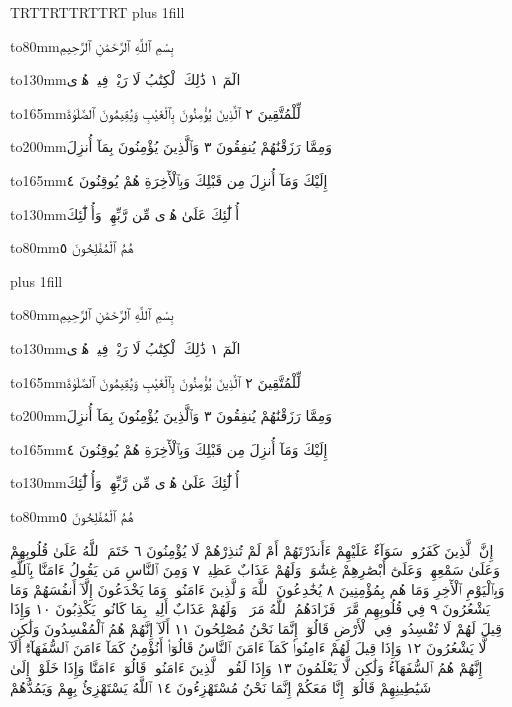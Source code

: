\documentclass{article}
\begin{document}
\medinafontvar\pagedir TRT\pardir TRT\bodydir TRT\textdir TRT
\topglue 0pt plus 1fill
\leavevmode
\centerline{\hbox to80mm{بِسْمِ ٱللَّهِ ٱلرَّحْمَٰنِ ٱلرَّحِيمِ}}
\centerline{\hbox to130mm{الٓمٓ ١ ذَٰلِكَ ٱلْكِتَٰبُ لَا رَيْبَۛ فِيهِۛ هُدࣰى}}
\centerline{\hbox to165mm{لِّلْمُتَّقِينَ ٢ ٱلَّذِينَ يُؤْمِنُونَ بِٱلْغَيْبِ وَيُقِيمُونَ ٱلصَّلَوٰةَ}}
\centerline{\hbox to200mm{وَمِمَّا رَزَقْنَٰهُمْ يُنفِقُونَ ٣ وَٱلَّذِينَ يُؤْمِنُونَ بِمَآ أُنزِلَ}}
\centerline{\hbox to165mm{إِلَيْكَ وَمَآ أُنزِلَ مِن قَبْلِكَ وَبِٱلْأٓخِرَةِ هُمْ يُوقِنُونَ ٤}}
\centerline{\hbox to130mm{أُو۟لَٰٓئِكَ عَلَىٰ هُدࣰى مِّن رَّبِّهِمْۖ وَأُو۟لَٰٓئِكَ}}
\centerline{\hbox to80mm{هُمُ ٱلْمُفْلِحُونَ ٥}}
\vfill
\newpage\topglue 0pt plus 1fill
\leavevmode
\centerline{\hbox to80mm{بِسْمِ ٱللَّهِ ٱلرَّحْمَٰنِ ٱلرَّحِيمِ}}
\centerline{\hbox to130mm{الٓمٓ ١ ذَٰلِكَ ٱلْكِتَٰبُ لَا رَيْبَۛ فِيهِۛ هُدࣰى}}
\centerline{\hbox to165mm{لِّلْمُتَّقِينَ ٢ ٱلَّذِينَ يُؤْمِنُونَ بِٱلْغَيْبِ وَيُقِيمُونَ ٱلصَّلَوٰةَ}}
\centerline{\hbox to200mm{وَمِمَّا رَزَقْنَٰهُمْ يُنفِقُونَ ٣ وَٱلَّذِينَ يُؤْمِنُونَ بِمَآ أُنزِلَ}}
\centerline{\hbox to165mm{إِلَيْكَ وَمَآ أُنزِلَ مِن قَبْلِكَ وَبِٱلْأٓخِرَةِ هُمْ يُوقِنُونَ ٤}}
\centerline{\hbox to130mm{أُو۟لَٰٓئِكَ عَلَىٰ هُدࣰى مِّن رَّبِّهِمْۖ وَأُو۟لَٰٓئِكَ}}
\centerline{\hbox to80mm{هُمُ ٱلْمُفْلِحُونَ ٥}}
\vfill
\newpage
{}
\sloppy
إِنَّ ٱلَّذِينَ كَفَرُوا۟ سَوَآءٌ عَلَيْهِمْ ءَأَنذَرْتَهُمْ أَمْ لَمْ تُنذِرْهُمْ
لَا يُؤْمِنُونَ ٦ خَتَمَ ٱللَّهُ عَلَىٰ قُلُوبِهِمْ وَعَلَىٰ سَمْعِهِمْۖ وَعَلَىٰٓ
أَبْصَٰرِهِمْ غِشَٰوَةࣱۖ وَلَهُمْ عَذَابٌ عَظِيمࣱ ٧ وَمِنَ ٱلنَّاسِ
مَن يَقُولُ ءَامَنَّا بِٱللَّهِ وَبِٱلْيَوْمِ ٱلْأٓخِرِ وَمَا هُم بِمُؤْمِنِينَ ٨
يُخَٰدِعُونَ ٱللَّهَ وَٱلَّذِينَ ءَامَنُوا۟ وَمَا يَخْدَعُونَ إِلَّآ أَنفُسَهُمْ
وَمَا يَشْعُرُونَ ٩ فِي قُلُوبِهِم مَّرَضࣱ فَزَادَهُمُ ٱللَّهُ مَرَضࣰاۖ
وَلَهُمْ عَذَابٌ أَلِيمُۢ بِمَا كَانُوا۟ يَكْذِبُونَ ١٠ وَإِذَا قِيلَ لَهُمْ
لَا تُفْسِدُوا۟ فِي ٱلْأَرْضِ قَالُوٓا۟ إِنَّمَا نَحْنُ مُصْلِحُونَ ١١ أَلَآ إِنَّهُمْ
هُمُ ٱلْمُفْسِدُونَ وَلَٰكِن لَّا يَشْعُرُونَ ١٢ وَإِذَا قِيلَ لَهُمْ
ءَامِنُوا۟ كَمَآ ءَامَنَ ٱلنَّاسُ قَالُوٓا۟ أَنُؤْمِنُ كَمَآ ءَامَنَ ٱلسُّفَهَآءُۗ
أَلَآ إِنَّهُمْ هُمُ ٱلسُّفَهَآءُ وَلَٰكِن لَّا يَعْلَمُونَ ١٣ وَإِذَا لَقُوا۟
ٱلَّذِينَ ءَامَنُوا۟ قَالُوٓا۟ ءَامَنَّا وَإِذَا خَلَوْا۟ إِلَىٰ شَيَٰطِينِهِمْ قَالُوٓا۟ إِنَّا
مَعَكُمْ إِنَّمَا نَحْنُ مُسْتَهْزِءُونَ ١٤ ٱللَّهُ يَسْتَهْزِئُ بِهِمْ وَيَمُدُّهُمْ
\end{document}
